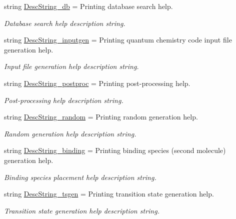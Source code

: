 \begin{DoxyCompactItemize}
string \hyperlink{namespacemolSimplify_1_1____main_____a314d123a302fd3449d6d3dbb3cb27b8d}{Desc\+String\+\_\+db} = \textquotesingle{}Printing database search help.\textquotesingle{}
\begin{DoxyCompactList}\small\item\em Database search help description string. \end{DoxyCompactList}\item 
string \hyperlink{namespacemolSimplify_1_1____main_____a1af5cd3b5f20025e5f4cb6ba23547f4f}{Desc\+String\+\_\+inputgen} = \textquotesingle{}Printing quantum chemistry code input file generation help.\textquotesingle{}
\begin{DoxyCompactList}\small\item\em Input file generation help description string. \end{DoxyCompactList}\item 
string \hyperlink{namespacemolSimplify_1_1____main_____aa19f048e1fe6ed31edc79a7f0ab58982}{Desc\+String\+\_\+postproc} = \textquotesingle{}Printing post-\/processing help.\textquotesingle{}
\begin{DoxyCompactList}\small\item\em Post-\/processing help description string. \end{DoxyCompactList}\item 
string \hyperlink{namespacemolSimplify_1_1____main_____a0a31dce622ac102581d73cd746598943}{Desc\+String\+\_\+random} = \textquotesingle{}Printing random generation help.\textquotesingle{}
\begin{DoxyCompactList}\small\item\em Random generation help description string. \end{DoxyCompactList}\item 
string \hyperlink{namespacemolSimplify_1_1____main_____a66178dfe9e4007b22bd17c4e05c1fb00}{Desc\+String\+\_\+binding} = \textquotesingle{}Printing binding species (second molecule) generation help.\textquotesingle{}
\begin{DoxyCompactList}\small\item\em Binding species placement help description string. \end{DoxyCompactList}\item 
string \hyperlink{namespacemolSimplify_1_1____main_____ab0c1aa41d4731fa63cb84b238351653f}{Desc\+String\+\_\+tsgen} = \textquotesingle{}Printing transition state generation help.\textquotesingle{}
\begin{DoxyCompactList}\small\item\em Transition state generation help description string. \end{DoxyCompactList}\item 

\end{DoxyCompactItemize}
